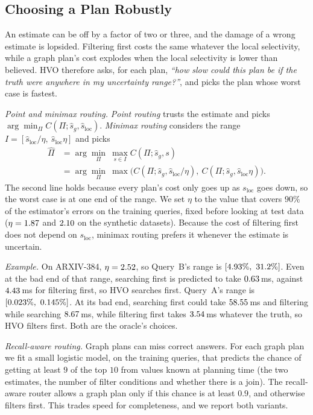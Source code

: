 \documentclass[sigconf, nonacm]{acmart}
\newcommand{\sloc}{s_{\text{loc}}}
\begin{document}
\subsection{Choosing a Plan Robustly}\label{sec:route}
An estimate can be off by a factor of two or three, and the damage of a wrong estimate is lopsided. Filtering first costs the same whatever the local selectivity, while a graph plan's cost explodes when the local selectivity is lower than believed. HVO therefore asks, for each plan, \emph{``how slow could this plan be if the truth were anywhere in my uncertainty range?''}, and picks the plan whose worst case is fastest.

\emph{Point and minimax routing.} \emph{Point routing} trusts the estimate and picks $\arg\min_\Pi C(\Pi;\hat s_g,\hat s_{\text{loc}})$. \emph{Minimax routing} considers the range $I=[\hat s_{\text{loc}}/\eta,\ \hat s_{\text{loc}}\eta]$ and picks
\begin{equation}\label{eq:robust}
\begin{aligned}
\hat\Pi&=\arg\min_\Pi\ \max_{s\in I}C(\Pi;\hat s_g,s)\\
&=\arg\min_\Pi\ \max\big(C(\Pi;\hat s_g,\hat s_{\text{loc}}/\eta),\ C(\Pi;\hat s_g,\hat s_{\text{loc}}\eta)\big).
\end{aligned}
\end{equation}
The second line holds because every plan's cost only goes up as $\sloc$ goes down, so the worst case is at one end of the range. We set $\eta$ to the value that covers $90\%$ of the estimator's errors on the training queries, fixed before looking at test data ($\eta=1.87$ and $2.10$ on the synthetic datasets). Because the cost of filtering first does not depend on $\sloc$, minimax routing prefers it whenever the estimate is uncertain.

\emph{Example.} On ARXIV-384, $\eta=2.52$, so Query~B's range is $[4.93\%,\ 31.2\%]$. Even at the bad end of that range, searching first is predicted to take $0.63$\,ms, against $4.43$\,ms for filtering first, so HVO searches first. Query~A's range is $[0.023\%,\ 0.145\%]$. At its bad end, searching first could take $58.55$\,ms and filtering while searching $8.67$\,ms, while filtering first takes $3.54$\,ms whatever the truth, so HVO filters first. Both are the oracle's choices.

\emph{Recall-aware routing.} Graph plans can miss correct answers. For each graph plan we fit a small logistic model, on the training queries, that predicts the chance of getting at least $9$ of the top $10$ from values known at planning time (the two estimates, the number of filter conditions and whether there is a join). The recall-aware router allows a graph plan only if this chance is at least $0.9$, and otherwise filters first. This trades speed for completeness, and we report both variants.
\end{document}

